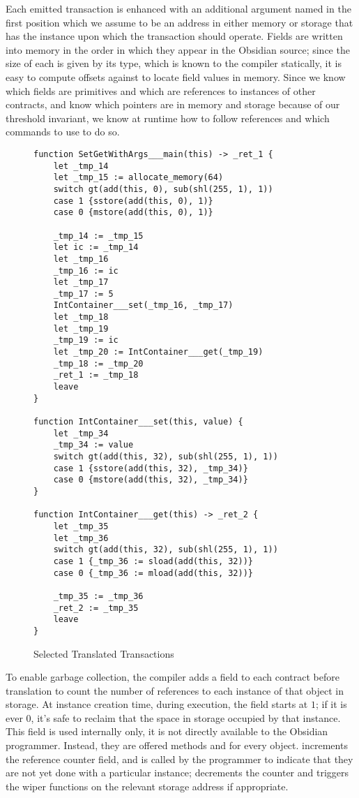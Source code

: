 Each emitted transaction is enhanced with an additional argument
named  in the first position which we assume to be an address
in either memory or storage that has the instance upon which the
transaction should operate. Fields are written into memory in the order in
which they appear in the Obsidian source; since the size of each is given
by its type, which is known to the compiler statically, it is easy to
compute offsets against  to locate field values in
memory. Since we know which fields are primitives and which are references
to instances of other contracts, and know which pointers are in memory and
storage because of our threshold invariant, we know at runtime how to
follow references and which commands to use to do so.

\begin{figure}[hbtp]
    \caption{Selected Translated Transactions}
    \label{code.8}
    \begin{lstlisting}[language=yul,frame=single]
function SetGetWithArgs___main(this) -> _ret_1 {
    let _tmp_14
    let _tmp_15 := allocate_memory(64)
    switch gt(add(this, 0), sub(shl(255, 1), 1))
    case 1 {sstore(add(this, 0), 1)}
    case 0 {mstore(add(this, 0), 1)}

    _tmp_14 := _tmp_15
    let ic := _tmp_14
    let _tmp_16
    _tmp_16 := ic
    let _tmp_17
    _tmp_17 := 5
    IntContainer___set(_tmp_16, _tmp_17)
    let _tmp_18
    let _tmp_19
    _tmp_19 := ic
    let _tmp_20 := IntContainer___get(_tmp_19)
    _tmp_18 := _tmp_20
    _ret_1 := _tmp_18
    leave
}

function IntContainer___set(this, value) {
    let _tmp_34
    _tmp_34 := value
    switch gt(add(this, 32), sub(shl(255, 1), 1))
    case 1 {sstore(add(this, 32), _tmp_34)}
    case 0 {mstore(add(this, 32), _tmp_34)}
}

function IntContainer___get(this) -> _ret_2 {
    let _tmp_35
    let _tmp_36
    switch gt(add(this, 32), sub(shl(255, 1), 1))
    case 1 {_tmp_36 := sload(add(this, 32))}
    case 0 {_tmp_36 := mload(add(this, 32))}

    _tmp_35 := _tmp_36
    _ret_2 := _tmp_35
    leave
}
    \end{lstlisting}
\end{figure}

To enable garbage collection, the compiler adds a field to each contract
before translation to count the number of references to each instance of
that object in storage. At instance creation time, during execution, the
field starts at $1$; if it is ever $0$, it's safe to reclaim that the space
in storage occupied by that instance. This field is used internally only,
it is not directly available to the Obsidian programmer. Instead, they are
offered methods  and  for every
object.  increments the reference counter field, and is
called by the programmer to indicate that they are not yet done with a
particular instance;  decrements the counter and triggers
the wiper functions on the relevant storage address if appropriate.

